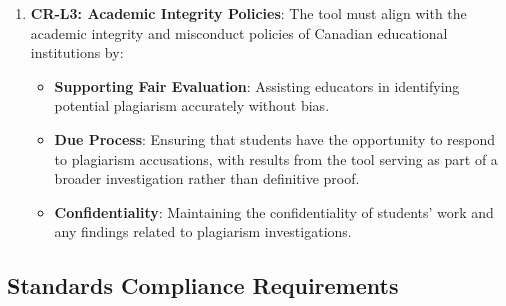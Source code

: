 \documentclass[12pt]{article}
\begin{document}
\begin{enumerate}
    \item \textbf{CR-L3: Academic Integrity Policies}: The tool must align with the academic
    integrity and misconduct policies of Canadian educational institutions by:
    \begin{itemize}
        \item \textbf{Supporting Fair Evaluation}: Assisting educators in identifying
        potential plagiarism accurately without bias.
        \item \textbf{Due Process}: Ensuring that students have the opportunity to respond
        to plagiarism accusations, with results from the tool serving as part of a broader
        investigation rather than definitive proof.
        \item \textbf{Confidentiality}: Maintaining the confidentiality of students' work
        and any findings related to plagiarism investigations.
    \end{itemize}
\end{enumerate}

\subsection{Standards Compliance Requirements}
\end{document}
